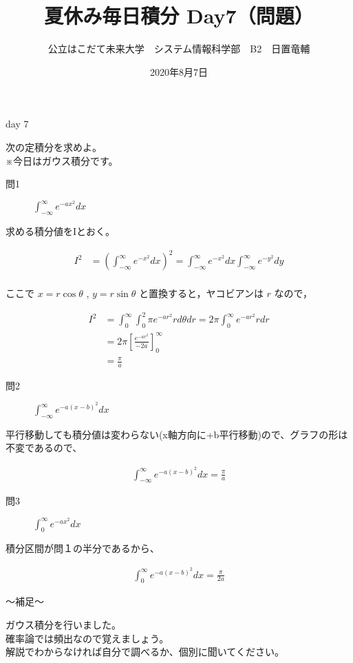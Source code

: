 \documentclass[dvipdfmx,uplatex]{jsarticle}
\title{夏休み毎日積分 Day7（問題）}
\author{公立はこだて未来大学　システム情報科学部　B2　日置竜輔}
\date{2020年8月7日}
\begin{document}
\maketitle

\begin{itembox}{day 7}
    \begin{center}
        次の定積分を求めよ。\\
        ※今日はガウス積分です。
    \end{center}
\end{itembox}

\begin{description}
    \item [問1] $\displaystyle \int_{-\infty}^{\infty} e^{-ax^2} dx$
\end{description}

求める積分値をIとおく。

\begin{align*}
    I^2 &= \left(\int_{-\infty}^{\infty} e^{-x^2} dx\right)^2
    =  \int_{-\infty}^{\infty} e^{-x^2} dx \int_{-\infty}^{\infty} e^{-y^2} dy\\
\end{align*}

ここで $x = r\cos\theta$ , $y = r\sin\theta$ と置換すると，ヤコビアンは $r$ なので，

\begin{align*}
    I^2 &= \int_0^{\infty} \int_0^2{\pi} e^{-ar^2} r d{\theta}dr
    = 2{\pi} \int_0^{\infty} e^{-ar^2} r dr \\
    &= 2{\pi} \left[\frac{e^{-ar^2}}{-2a}\right]_0^{\infty} \\
    &= \frac{\pi}{a}
\end{align*}

\begin{description}
    \item [問2] $\displaystyle \int_{-\infty}^{\infty} e^{-a(x-b)^2} dx$
\end{description}

平行移動しても積分値は変わらない(x軸方向に+b平行移動)ので、グラフの形は不変であるので、

\begin{align*}
    \int_{-\infty}^{\infty} e^{-a(x-b)^2} dx = \frac{\pi}{a}
\end{align*}

\begin{description}
    \item [問3] $\displaystyle \int_0^{\infty} e^{-ax^2} dx$
\end{description}

積分区間が問１の半分であるから、

\begin{align*}
    \int_0^{\infty} e^{-a(x-b)^2} dx = \frac{\pi}{2a}
\end{align*}

\begin{boxnote}
    〜補足〜
    \begin{center}
        ガウス積分を行いました。\\
        確率論では頻出なので覚えましょう。\\
        解説でわからなければ自分で調べるか、個別に聞いてください。
    \end{center}
\end{boxnote}
\end{document}
